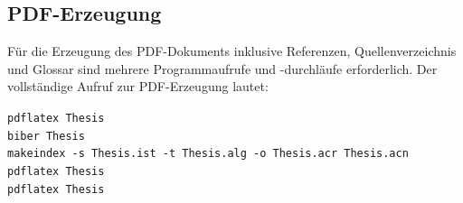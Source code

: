 \subsection{PDF-Erzeugung}

Für die Erzeugung des PDF-Dokuments inklusive Referenzen, Quellenverzeichnis und Glossar sind mehrere Programmaufrufe und -durchläufe erforderlich. Der vollständige Aufruf zur PDF-Erzeugung lautet: 

\texttt{pdflatex Thesis}\\
\texttt{biber Thesis}\\
\texttt{makeindex -s Thesis.ist -t Thesis.alg -o Thesis.acr Thesis.acn}\\
\texttt{pdflatex Thesis}\\
\texttt{pdflatex Thesis}\\